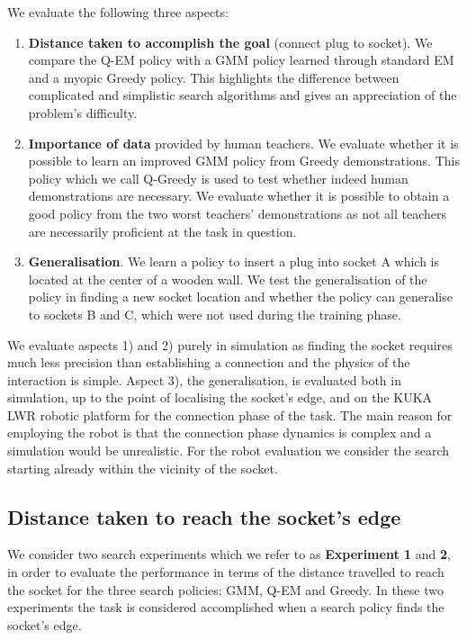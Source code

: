 \documentclass[final,5p,times,twocolumn]{elsarticle}
\begin{document}
We evaluate the following three aspects:
\begin{enumerate}
 \item \textbf{Distance taken to accomplish the goal} (connect plug to socket). We compare the Q-EM policy with 
 a GMM policy learned through standard EM and a myopic Greedy policy. This highlights the difference between complicated and simplistic  
  search algorithms and gives an appreciation of the problem's difficulty.
 \item \textbf{Importance of data} provided by human teachers. We evaluate whether it is possible to learn 
 an improved GMM policy from Greedy demonstrations. This policy which we call Q-Greedy is used to test whether 
 indeed human demonstrations are necessary. We evaluate whether it is possible to obtain a good policy from the two worst teachers' demonstrations as not all teachers 
 are necessarily proficient at the task in question. 
  \item \textbf{Generalisation}. We learn a policy to insert a plug into socket A which is located at the center of a wooden 
 wall. We test the generalisation of the policy in finding a new socket location and whether the policy can generalise to sockets 
 B and C, which were not used during the training phase.
\end{enumerate}

We evaluate aspects 1) and 2) purely in simulation as finding the socket requires much less precision than establishing a 
connection and the physics of the interaction is simple. Aspect 3), the generalisation, is evaluated both in simulation,
up to the point of localising the socket's edge, and on the KUKA LWR robotic platform
for the connection phase of the task. The main reason for employing the robot is that the connection phase dynamics is 
complex and a simulation would be unrealistic. For the robot evaluation we consider 
the search starting already within the vicinity of the socket.

\subsection{Distance taken to reach the socket's edge}

We consider two search experiments which we refer to as \textbf{Experiment 1} and \textbf{2}, in order to evaluate the performance 
in terms of the distance travelled to reach the socket for the three search policies: GMM, Q-EM and Greedy. In these two 
experiments the task is considered accomplished when a search policy finds the socket's edge. 
\end{document}
